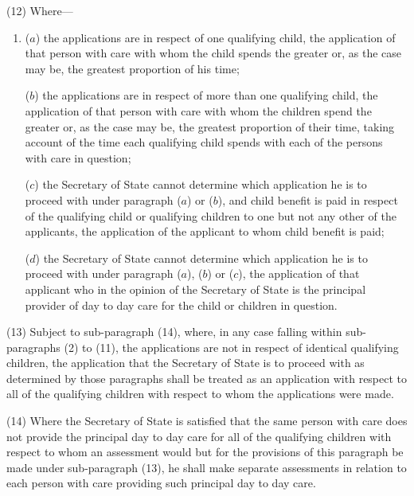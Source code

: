 \documentclass[a4paper,12pt]{article}
\begin{document}
(12) Where—
\begin{enumerate}\item[]
($a$) the applications are in respect of one qualifying child, the application of that person with care with whom the child spends the greater or, as the case may be, the greatest proportion of his time;

($b$) the applications are in respect of more than one qualifying child, the application of that person with care with whom the children spend the greater or, as the case may be, the greatest proportion of their time, taking account of the time each qualifying child spends with each of the persons with care in question;

($c$) 
the Secretary of State  %
cannot determine which application he is to proceed with under paragraph ($a$) or ($b$), and child benefit is paid in respect of the qualifying child or qualifying children to one but not any other of the applicants, the application of the applicant to whom child benefit is paid;

($d$) 
the Secretary of State  %
cannot determine which application he is to proceed with under paragraph ($a$), ($b$) or ($c$), the application of that applicant who in the opinion of 
the Secretary of State  %
is the principal provider of day to day care for the child or children in question.
\end{enumerate}

(13) Subject to sub-paragraph (14), where, in any case falling within sub-paragraphs (2) to (11), the applications are not in respect of identical qualifying children, the application that 
the Secretary of State  %
is to proceed with as determined by those paragraphs shall be treated as an application with respect to all of the qualifying children with respect to whom the applications were made.

(14) Where 
the Secretary of State  %
is satisfied that the same person with care does not provide the principal day to day care for all of the qualifying children with respect to whom an assessment would but for the provisions of this paragraph be made under sub-paragraph (13), he shall make separate assessments in relation to each person with care providing such principal day to day care.
\end{document}
